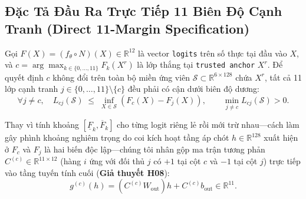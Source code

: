 \documentclass[11pt,a4paper]{article}
\newcommand{\R}{\mathbb{R}}
\newcommand{\code}[1]{{\small\ttfamily\nolinkurl{#1}}}
\newcommand{\Sset}{\mathcal{S}}
\theoremstyle{remark}
\begin{document}
\subsection{Đặc Tả Đầu Ra Trực Tiếp 11 Biên Độ Cạnh Tranh (Direct 11-Margin Specification)}
Gọi $F(X) = (f_\theta \circ N)(X) \in \R^{12}$ là vector \code{logits} trên số thực tại đầu vào $X$, và $c = \arg\max_{k \in \{0,\dots,11\}} F_k(X^r)$ là lớp thắng tại \code{trusted anchor} $X^r$. Để quyết định $c$ không đổi trên toàn bộ miền ứng viên $\Sset \subset \R^{6 \times 128}$ chứa $X^r$, tất cả 11 lớp cạnh tranh $j \in \{0,\dots,11\} \setminus \{c\}$ đều phải có cận dưới biên độ dương:
\begin{equation}
  \forall j \neq c, \quad L_{cj}(\Sset) \;\le\; \inf_{X \in \Sset} \left( F_c(X) - F_j(X) \right), \qquad \min_{j \neq c} L_{cj}(\Sset) > 0.
\end{equation}

Thay vì tính khoảng $[\underline{F}_k, \overline{F}_k]$ cho từng logit riêng lẻ rồi mới trừ nhau---cách làm gây phình khoảng nghiêm trọng do coi kích hoạt tầng áp chót $h \in \R^{128}$ xuất hiện ở $F_c$ và $F_j$ là hai biến độc lập---chúng tôi nhân gộp ma trận tương phản $C^{(c)} \in \R^{11 \times 12}$ (hàng $i$ ứng với đối thủ $j$ có $+1$ tại cột $c$ và $-1$ tại cột $j$) trực tiếp vào tầng tuyến tính cuối (\textbf{Giả thuyết H08}):
\begin{equation}
  g^{(c)}(h) = \left( C^{(c)} W_{\text{out}} \right) h + C^{(c)} b_{\text{out}} \in \R^{11}.
\end{equation}
\end{document}
